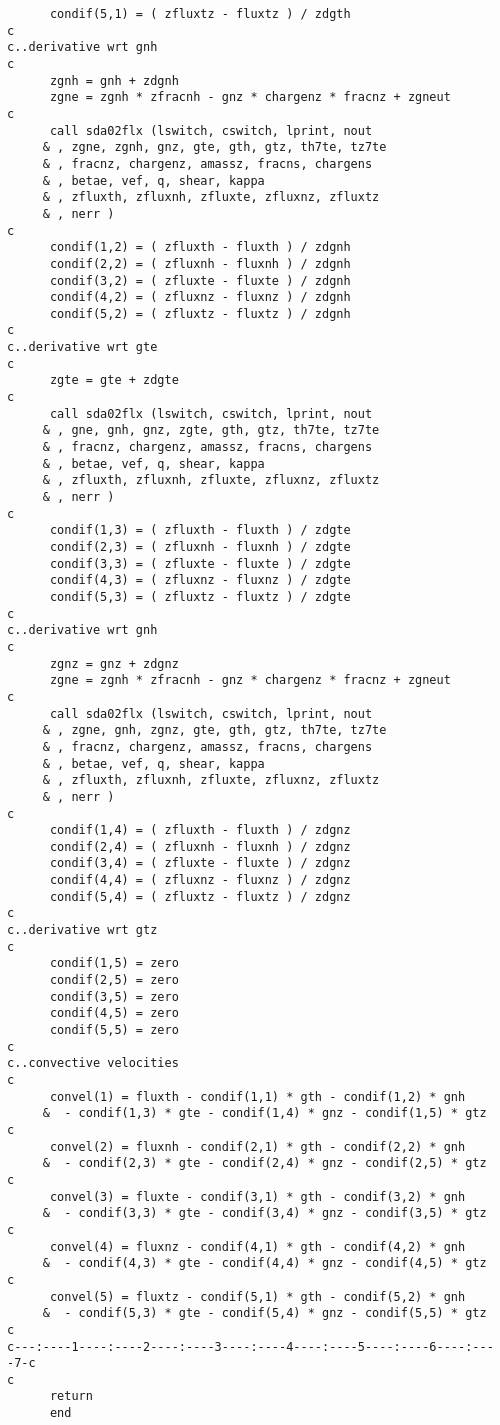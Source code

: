 \begin{verbatim}
      condif(5,1) = ( zfluxtz - fluxtz ) / zdgth
c
c..derivative wrt gnh
c
      zgnh = gnh + zdgnh
      zgne = zgnh * zfracnh - gnz * chargenz * fracnz + zgneut
c
      call sda02flx (lswitch, cswitch, lprint, nout
     & , zgne, zgnh, gnz, gte, gth, gtz, th7te, tz7te
     & , fracnz, chargenz, amassz, fracns, chargens
     & , betae, vef, q, shear, kappa
     & , zfluxth, zfluxnh, zfluxte, zfluxnz, zfluxtz
     & , nerr )
c
      condif(1,2) = ( zfluxth - fluxth ) / zdgnh
      condif(2,2) = ( zfluxnh - fluxnh ) / zdgnh
      condif(3,2) = ( zfluxte - fluxte ) / zdgnh
      condif(4,2) = ( zfluxnz - fluxnz ) / zdgnh
      condif(5,2) = ( zfluxtz - fluxtz ) / zdgnh
c
c..derivative wrt gte
c
      zgte = gte + zdgte
c
      call sda02flx (lswitch, cswitch, lprint, nout
     & , gne, gnh, gnz, zgte, gth, gtz, th7te, tz7te
     & , fracnz, chargenz, amassz, fracns, chargens
     & , betae, vef, q, shear, kappa
     & , zfluxth, zfluxnh, zfluxte, zfluxnz, zfluxtz
     & , nerr )
c
      condif(1,3) = ( zfluxth - fluxth ) / zdgte
      condif(2,3) = ( zfluxnh - fluxnh ) / zdgte
      condif(3,3) = ( zfluxte - fluxte ) / zdgte
      condif(4,3) = ( zfluxnz - fluxnz ) / zdgte
      condif(5,3) = ( zfluxtz - fluxtz ) / zdgte
c
c..derivative wrt gnh
c
      zgnz = gnz + zdgnz
      zgne = zgnh * zfracnh - gnz * chargenz * fracnz + zgneut
c
      call sda02flx (lswitch, cswitch, lprint, nout
     & , zgne, gnh, zgnz, gte, gth, gtz, th7te, tz7te
     & , fracnz, chargenz, amassz, fracns, chargens
     & , betae, vef, q, shear, kappa
     & , zfluxth, zfluxnh, zfluxte, zfluxnz, zfluxtz
     & , nerr )
c
      condif(1,4) = ( zfluxth - fluxth ) / zdgnz
      condif(2,4) = ( zfluxnh - fluxnh ) / zdgnz
      condif(3,4) = ( zfluxte - fluxte ) / zdgnz
      condif(4,4) = ( zfluxnz - fluxnz ) / zdgnz
      condif(5,4) = ( zfluxtz - fluxtz ) / zdgnz
c
c..derivative wrt gtz
c
      condif(1,5) = zero
      condif(2,5) = zero
      condif(3,5) = zero
      condif(4,5) = zero
      condif(5,5) = zero
c
c..convective velocities
c
      convel(1) = fluxth - condif(1,1) * gth - condif(1,2) * gnh
     &  - condif(1,3) * gte - condif(1,4) * gnz - condif(1,5) * gtz
c
      convel(2) = fluxnh - condif(2,1) * gth - condif(2,2) * gnh
     &  - condif(2,3) * gte - condif(2,4) * gnz - condif(2,5) * gtz
c
      convel(3) = fluxte - condif(3,1) * gth - condif(3,2) * gnh
     &  - condif(3,3) * gte - condif(3,4) * gnz - condif(3,5) * gtz
c
      convel(4) = fluxnz - condif(4,1) * gth - condif(4,2) * gnh
     &  - condif(4,3) * gte - condif(4,4) * gnz - condif(4,5) * gtz
c
      convel(5) = fluxtz - condif(5,1) * gth - condif(5,2) * gnh
     &  - condif(5,3) * gte - condif(5,4) * gnz - condif(5,5) * gtz
c
c---:----1----:----2----:----3----:----4----:----5----:----6----:----7-c
c
      return
      end
\end{verbatim}

